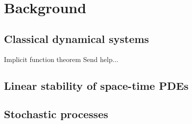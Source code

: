 \documentclass[../main.tex]{subfiles}
\begin{document}
\section{Background}\label{sec2}
\subsection{Classical dynamical systems}\label{subsec2.1}
\begin{theorem}[label=thm2.1]{Implicit function theorem}{}
     Send help...
\end{theorem}
\subsection{Linear stability of space-time PDEs}\label{subsec2.2}
\subsection{Stochastic processes}\label{subsec2.3}
\end{document}
